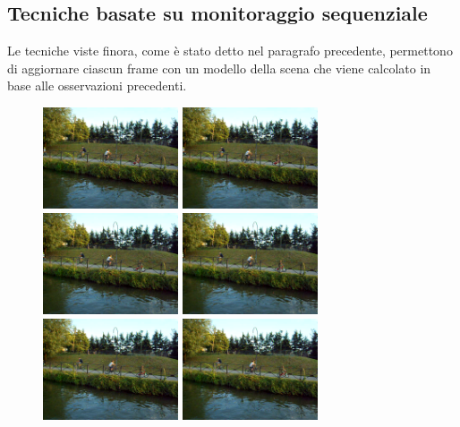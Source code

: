\subsection{Tecniche basate su monitoraggio sequenziale}
Le tecniche viste finora, come \`e stato detto nel paragrafo precedente, permettono di aggiornare ciascun frame con un modello della scena che viene calcolato in base alle osservazioni precedenti.
\begin{figure}
	\centering
	\includegraphics[width = 4cm]{./pictures/FPSalto/img0001}
	\includegraphics[width = 4cm]{./pictures/FPSalto/img0002}
	\includegraphics[width = 4cm]{./pictures/FPSalto/img0003}
	\includegraphics[width = 4cm]{./pictures/FPSalto/img0004}
	\includegraphics[width = 4cm]{./pictures/FPSalto/img0005}
	\includegraphics[width = 4cm]{./pictures/FPSalto/img0006}

\end{figure}
